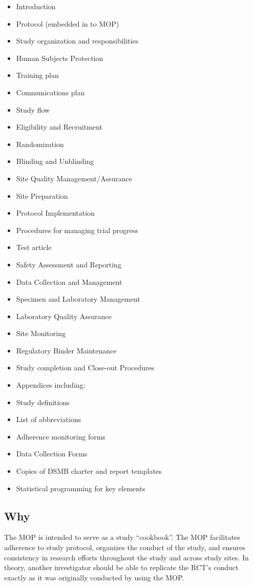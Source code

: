 \documentclass[]{book}
\providecommand{\tightlist}{%
  \setlength{\itemsep}{0pt}\setlength{\parskip}{0pt}}
\begin{document}
\begin{itemize}
\tightlist
\item
  Introduction
\item
  Protocol (embedded in to MOP)
\item
  Study organization and responsibilities
\item
  Human Subjects Protection
\item
  Training plan
\item
  Communications plan
\item
  Study flow
\item
  Eligibility and Recruitment
\item
  Randomization
\item
  Blinding and Unblinding
\item
  Site Quality Management/Assurance
\item
  Site Preparation
\item
  Protocol Implementation
\item
  Procedures for managing trial progress
\item
  Test article
\item
  Safety Assessment and Reporting
\item
  Data Collection and Management
\item
  Specimen and Laboratory Management
\item
  Laboratory Quality Assurance
\item
  Site Monitoring
\item
  Regulatory Binder Maintenance
\item
  Study completion and Close-out Procedures
\item
  Appendices including:
\item
  Study definitions
\item
  List of abbreviations
\item
  Adherence monitoring forms
\item
  Data Collection Forms
\item
  Copies of DSMB charter and report templates
\item
  Statistical programming for key elements
\end{itemize}

\subsection{Why}\label{why-12}

The MOP is intended to serve as a study ``cookbook''. The MOP
facilitates adherence to study protocol, organizes the conduct of the
study, and ensures consistency in research efforts throughout the study
and across study sites. In theory, another investigator should be able
to replicate the RCT's conduct exactly as it was originally conducted by
using the MOP.
\end{document}
